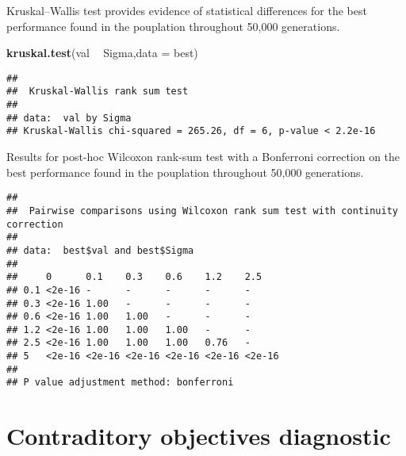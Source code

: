 \documentclass[]{book}
\newenvironment{Shaded}{\begin{snugshade}}{\end{snugshade}}
\newcommand{\DataTypeTok}[1]{\textcolor[rgb]{0.13,0.29,0.53}{#1}}
\newcommand{\KeywordTok}[1]{\textcolor[rgb]{0.13,0.29,0.53}{\textbf{#1}}}
\newcommand{\NormalTok}[1]{#1}
\newcommand{\OperatorTok}[1]{\textcolor[rgb]{0.81,0.36,0.00}{\textbf{#1}}}
\newcommand{\OtherTok}[1]{\textcolor[rgb]{0.56,0.35,0.01}{#1}}
\newcommand{\StringTok}[1]{\textcolor[rgb]{0.31,0.60,0.02}{#1}}
\begin{document}
Kruskal--Wallis test provides evidence of statistical differences for the best performance found in the pouplation throughout 50,000 generations.

\begin{Shaded}
\begin{Highlighting}[]
\KeywordTok{kruskal.test}\NormalTok{(val }\OperatorTok{~}\StringTok{ }\NormalTok{Sigma,}\DataTypeTok{data =}\NormalTok{ best)}
\end{Highlighting}
\end{Shaded}

\begin{verbatim}
## 
##  Kruskal-Wallis rank sum test
## 
## data:  val by Sigma
## Kruskal-Wallis chi-squared = 265.26, df = 6, p-value < 2.2e-16
\end{verbatim}

Results for post-hoc Wilcoxon rank-sum test with a Bonferroni correction on the best performance found in the pouplation throughout 50,000 generations.

\begin{Shaded}
\end{Shaded}

\begin{verbatim}
## 
##  Pairwise comparisons using Wilcoxon rank sum test with continuity correction 
## 
## data:  best$val and best$Sigma 
## 
##     0      0.1    0.3    0.6    1.2    2.5   
## 0.1 <2e-16 -      -      -      -      -     
## 0.3 <2e-16 1.00   -      -      -      -     
## 0.6 <2e-16 1.00   1.00   -      -      -     
## 1.2 <2e-16 1.00   1.00   1.00   -      -     
## 2.5 <2e-16 1.00   1.00   1.00   0.76   -     
## 5   <2e-16 <2e-16 <2e-16 <2e-16 <2e-16 <2e-16
## 
## P value adjustment method: bonferroni
\end{verbatim}

\hypertarget{contraditory-objectives-diagnostic-2}{%
\section{Contraditory objectives diagnostic}\label{contraditory-objectives-diagnostic-2}}
\end{document}
